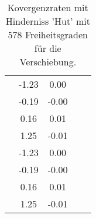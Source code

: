 \begin{table}
\begin{tabular}{c|cc|cc|}
\multicolumn{1}{|c|}{} & \multicolumn{1}{|c|}{     -1.23} & \multicolumn{1}{|c|}{      0.00} & \multicolumn{1}{|c|}{} & \multicolumn{1}{|c|}{} \\ 
\multicolumn{1}{|c|}{} & \multicolumn{1}{|c|}{     -0.19} & \multicolumn{1}{|c|}{     -0.00} & \multicolumn{1}{|c|}{} & \multicolumn{1}{|c|}{} \\ 
\multicolumn{1}{|c|}{} & \multicolumn{1}{|c|}{      0.16} & \multicolumn{1}{|c|}{      0.01} & \multicolumn{1}{|c|}{} & \multicolumn{1}{|c|}{} \\ 
\multicolumn{1}{|c|}{} & \multicolumn{1}{|c|}{      1.25} & \multicolumn{1}{|c|}{     -0.01} & \multicolumn{1}{|c|}{} & \multicolumn{1}{|c|}{} \\ 
\multicolumn{1}{|c|}{} & \multicolumn{1}{|c|}{     -1.23} & \multicolumn{1}{|c|}{      0.00} & \multicolumn{1}{|c|}{} & \multicolumn{1}{|c|}{} \\ 
\multicolumn{1}{|c|}{} & \multicolumn{1}{|c|}{     -0.19} & \multicolumn{1}{|c|}{     -0.00} & \multicolumn{1}{|c|}{} & \multicolumn{1}{|c|}{} \\ 
\multicolumn{1}{|c|}{} & \multicolumn{1}{|c|}{      0.16} & \multicolumn{1}{|c|}{      0.01} & \multicolumn{1}{|c|}{} & \multicolumn{1}{|c|}{} \\ 
\multicolumn{1}{|c|}{} & \multicolumn{1}{|c|}{      1.25} & \multicolumn{1}{|c|}{     -0.01} & \multicolumn{1}{|c|}{} & \multicolumn{1}{|c|}{} \\ 
\hline 
\end{tabular}\caption{Kovergenzraten mit Hinderniss 'Hut' mit 578 Freiheitsgraden für die Verschiebung.}\label{tab:Rate_Hut_level3}
\end{table} 
